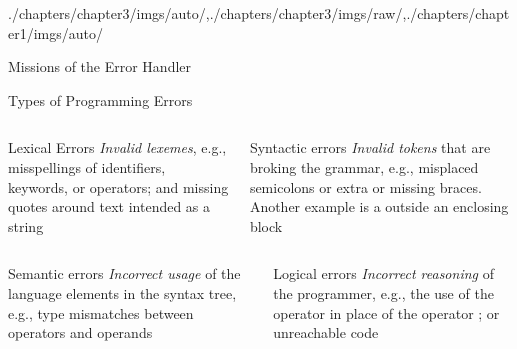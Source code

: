 \begin{graphicspathcontext}{{./chapters/chapter3/imgs/auto/},{./chapters/chapter3/imgs/raw/},{./chapters/chapter1/imgs/auto/}}
\begin{bibunit}[apalike]
\begin{frame}{{Missions} of the Error Handler}
	\hfill
	\hfill
\end{frame}

\begin{frame}{Types of Programming Errors}
	\begin{columns}
		\begin{column}[t]{.5\linewidth}
			\begin{block}{Lexical Errors}
				\emph{Invalid lexemes}, e.g., misspellings of identifiers, keywords, or operators; and missing quotes around text intended as a string
			\end{block}
		\end{column}
		\begin{column}[t]{.5\linewidth}
			\begin{block}{Syntactic errors}
				\emph{Invalid tokens} that are broking the grammar, e.g., misplaced semicolons or extra or missing braces. Another example is a  outside an enclosing  block
			\end{block}
		\end{column}
	\end{columns}
	\vspace{.25cm}
	\begin{columns}
		\begin{column}[t]{.5\linewidth}
			\begin{block}{Semantic errors}
				\emph{Incorrect usage} of the language elements in the syntax tree, e.g., type mismatches between operators and operands
			\end{block}
		\end{column}
		\begin{column}[t]{.5\linewidth}
			\begin{block}{Logical errors}
				\emph{Incorrect reasoning} of the programmer, e.g., the use of the operator  in place of the operator ; or unreachable code
			\end{block}
		\end{column}
	\end{columns}
\end{frame}


\end{bibunit}
\end{graphicspathcontext}
